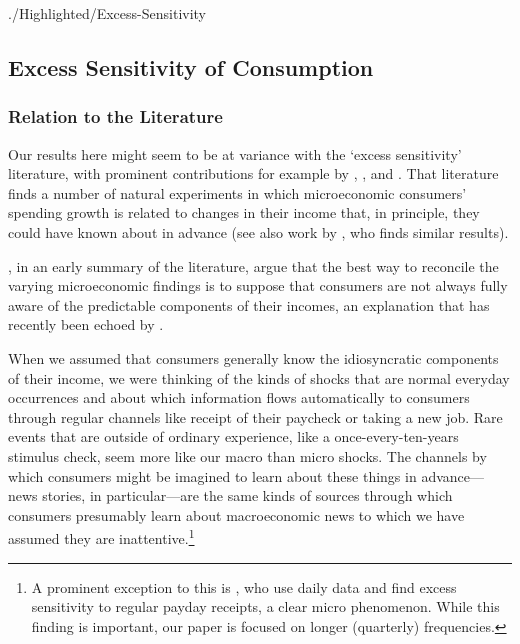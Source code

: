 \hypertarget{Excess-Sensitivity}{} %
\begin{verbatimwrite}{./Highlighted/Excess-Sensitivity}

\subsection{Excess Sensitivity of Consumption}

\subsubsection{Relation to the Literature}

Our results here might seem to be at variance with the `excess sensitivity' literature, with prominent contributions for example by \cite{soulelesTaxRefunds}, \cite{jpsTax}, and \cite{psjmMPC2008}.  That literature finds a number of natural experiments in which microeconomic consumers' spending growth is related to changes in their income that, in principle, they could have known about in advance (see also work by \cite{kuengTaxnews}, who finds similar results).

\cite{BrowningColladoAER}, in an early summary of the literature, argue that the best way to reconcile the varying microeconomic findings is to suppose that consumers are not always fully aware of the predictable components of their incomes, an explanation that has recently been echoed by \cite{parker25million}.

When we assumed that consumers generally know the idiosyncratic components of their income, we were thinking of the kinds of shocks that are normal everyday occurrences and about which information flows automatically to consumers through regular channels like receipt of their paycheck or taking a new job.  Rare events that are outside of ordinary experience, like a once-every-ten-years stimulus check, seem more like our macro than micro shocks.  The channels by which consumers might be imagined to learn about these things in advance---news stories, in particular---are the same kinds of sources through which consumers presumably learn about macroeconomic news to which we have assumed they are inattentive.\footnote{A prominent exception to this is \cite{opLiquidH2M}, who use daily data and find excess sensitivity to regular payday receipts, a clear micro phenomenon. While this finding is important, our paper is focused on longer (quarterly) frequencies.}


\end{verbatimwrite}
